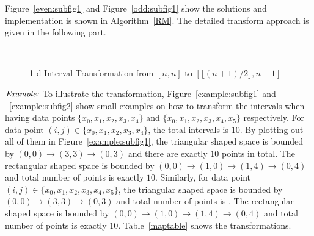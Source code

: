 \documentclass[10pt,journal,cspaper,compsoc]{IEEEtran}
\begin{document}
Figure~\ref{even:subfig1} and Figure~\ref{odd:subfig1} show the solutions and implementation is shown in Algorithm~\ref{RM}.  The detailed transform approach is given in the following part.

\begin{figure}[h]
\centering
{}
~~
\caption{1-d Interval Transformation from $[n,n]$ to $[\lfloor (n+1)/2 \rfloor,n+1]$}\label{modelBF}
\end{figure}

$\noindent \textit {Example:}$ To illustrate the transformation, Figure~\ref{example:subfig1} and ~\ref{example:subfig2} show small examples on how to transform the intervals when having data points $\{x_0,x_1,x_2,x_3,x_4\}$ and $\{x_0,x_1,x_2,x_3,x_4,x_5\}$ respectively. For data point $(i,j)\in \{x_0,x_1,x_2,x_3,x_4\}$, the total intervals is $10$. By plotting out all of them in Figure~\ref{example:subfig1}, the triangular shaped space is bounded by $(0,0)\rightarrow(3,3)\rightarrow (0,3)$ and there are exactly $10$ points in total. The rectangular shaped space is bounded by $(0,0)\rightarrow(1,0)\rightarrow (1,4)\rightarrow (0,4)$ and total number of points is exactly $10$. Similarly, for data point $(i,j)\in \{x_0,x_1,x_2,x_3,x_4,x_5\}$,  the triangular shaped space is bounded by $(0,0)\rightarrow(3,3)\rightarrow (0,3)$ and total number of points is . The rectangular shaped space is bounded by $(0,0)\rightarrow(1,0)\rightarrow (1,4)\rightarrow (0,4)$ and total number of points is exactly $10$. Table~\ref{maptable} shows the transformations.
\end{document}
